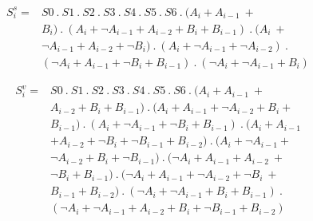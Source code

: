 \documentclass[conference]{IEEEtran_IBSS}
\begin{document}
\vspace{-1em}
\begin{equation}
\begin{aligned}
S_{i}^{s} ={} &S0 \ . \ S1 \ . \ S2 \ . \ S3 \ . \ S4 \ . \ S5 \ . \ S6 \ . \ (A_{i} + A_{i-1} \ + \ \\
&B_{i}) \ . \ (A_{i} + \neg A_{i-1} + A_{i-2} + B_{i} + B_{i-1}) \ . \ (A_{i} \ + \ \\
&\neg A_{i-1} + A_{i-2} + \neg B_{i}) \ . \ (A_{i} + \neg A_{i-1} + \neg A_{i-2}) \ . \ \\
&( \neg A_{i} + A_{i-1} + \neg B_{i}+ B_{i-1}) \ . \ ( \neg A_{i} + \neg A_{i-1} + B_{i})
\end{aligned}
\end{equation}

\vspace{-1em}
\begin{equation}
\begin{aligned}
S_{i}^{v} ={} &S0 \ . \ S1 \ . \ S2 \ . \ S3 \ . \ S4 \ . \ S5 \ . \ S6 \ . \ (A_{i} + A_{i-1} \ + \ \\
&A_{i-2} + B_{i} + B_{i-1}) \ . \ (A_{i} + A_{i-1} + \neg A_{i-2} + B_{i} + \\
&B_{i-1}) \ . \ (A_{i} + \neg A_{i-1} + \neg B_{i} + B_{i-1}) \ . \ (A_{i} + A_{i-1} \\
&+ A_{i-2} + \neg B_{i} + \neg B_{i-1} + B_{i-2}) \ . \ (A_{i} + \neg A_{i-1} + \\
&\neg A_{i-2} + B_{i} + \neg B_{i-1}) \ . \ ( \neg A_{i} + A_{i-1} + A_{i-2} \ + \ \\
&\neg B_{i} + B_{i-1}) \ . \ (\neg A_{i} + A_{i-1} + \neg A_{i-2} + \neg B_{i} \ + \ \\
&B_{i-1} + B_{i-2}) \ . \ ( \neg A_{i} + \neg A_{i-1} + B_{i} + B_{i-1}) \ . \ \\
&( \neg A_{i} + \neg A_{i-1} + A_{i-2} + B_{i} + \neg B_{i-1} + B_{i-2})
\end{aligned}
\end{equation}
\end{document}
